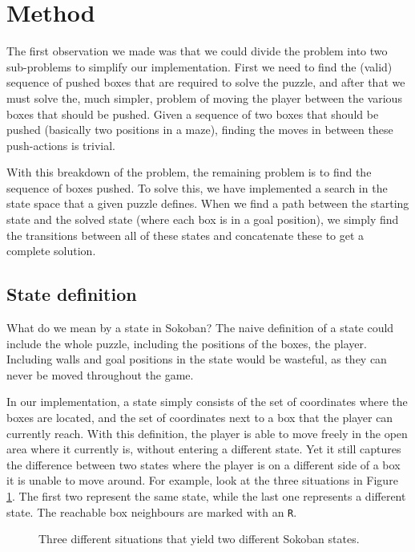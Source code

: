 \documentclass[a4paper,11pt]{article}
\begin{document}
\section{Method}

The first observation we made was that we could divide the problem into two sub-problems
to simplify our implementation.
First we need to find the (valid) sequence of pushed boxes that are required to solve
the puzzle, and after that we must solve the, much simpler, problem of moving the player
between the various boxes that should be pushed.
Given a sequence of two boxes that should be pushed (basically two positions in a maze),
finding the moves in between these push-actions is trivial.

With this breakdown of the problem, the remaining problem is to find the
sequence of boxes pushed.
To solve this, we have implemented a search in the state space that a given puzzle defines.
When we find a path between the starting state and the solved state (where each box is in a goal position),
we simply find the transitions between all of these states and concatenate these to get a complete solution.

\subsection{State definition}
\label{sec:statedef}

What do we mean by a state in Sokoban?
The naive definition of a state could include the whole puzzle,
including the positions of the boxes, the player.
Including walls and goal positions in the state would be wasteful,
as they can never be moved throughout the game.

In our implementation, a state simply consists of the set of coordinates where the boxes are located,
and the set of coordinates next to a box that the player can currently reach.
With this definition, the player is able to move freely in the
open area where it currently is, without entering a different state.
Yet it still captures the difference between two states where the player is on a different side of a
box it is unable to move around.
For example, look at the three situations in Figure \ref{example:states}.
The first two represent the same state,
while the last one represents a different state.
The reachable box neighbours are marked with an \verb!R!.

\begin{figure}[h!]
	\centering
\begin{center}
\end{center}
	\label{example:states}
	\caption{
		Three different situations that yield two different Sokoban states.
	}
\end{figure}
\end{document}
